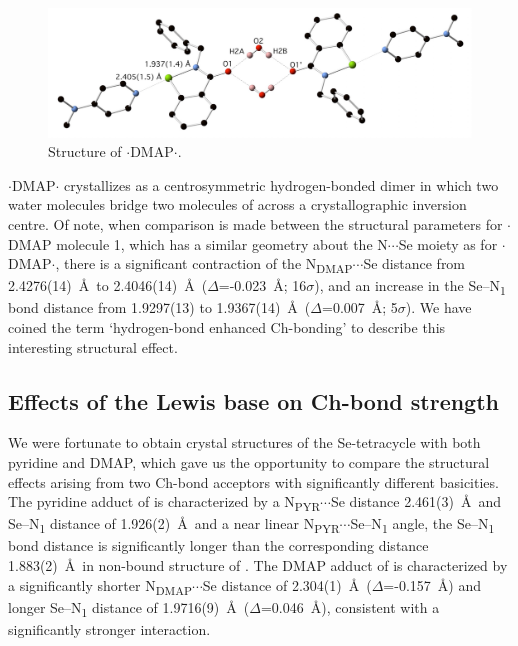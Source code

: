 \begin{figure}
  \centering
  \includegraphics[width=0.8\linewidth]{fig/benzyl-dmap-hydrate.pdf}
  \caption{Structure of $\cdot$DMAP$\cdot$.}
  \label{fig:benzyl-dmap-hydrate}
\end{figure}

$\cdot$DMAP$\cdot$ crystallizes as a centrosymmetric hydrogen-bonded dimer in which two water molecules bridge two molecules of  across a crystallographic inversion centre.
Of note, when comparison is made between the structural parameters for $\cdot$DMAP molecule 1, which has a similar geometry about the N$\cdots$Se moiety as for $\cdot$DMAP$\cdot$, there is a significant contraction of the N\textsubscript{DMAP}$\cdots$Se distance from 2.4276(14)~\AA\ to 2.4046(14)~\AA\ ($\Delta$=-0.023~\AA ; 16$\sigma$), and an increase in the Se--N\textsubscript{1} bond distance from 1.9297(13) to 1.9367(14)~\AA\ ($\Delta$=0.007~\AA ; 5$\sigma$).
We have coined the term `hydrogen-bond enhanced Ch-bonding' to describe this interesting structural effect.

\subsection{Effects of the Lewis base on Ch-bond strength}
We were fortunate to obtain crystal structures of the Se-tetracycle  with both pyridine and DMAP, which gave us the opportunity to compare the structural effects arising from two Ch-bond acceptors with significantly different basicities.
The pyridine adduct of  is characterized by a N\textsubscript{PYR}$\cdots$Se distance 2.461(3)~\AA\ and Se--N\textsubscript{1} distance of 1.926(2)~\AA\ and a near linear N\textsubscript{PYR}$\cdots$Se--N\textsubscript{1} angle, the Se--N\textsubscript{1} bond distance is significantly longer than the corresponding distance 1.883(2)~\AA\ in non-bound structure of .
The DMAP adduct of  is characterized by a significantly shorter N\textsubscript{DMAP}$\cdots$Se distance of 2.304(1)~\AA\ ($\Delta$=-0.157~\AA) and longer Se--N\textsubscript{1} distance of 1.9716(9)~\AA\ ($\Delta$=0.046~\AA), consistent with a significantly stronger interaction.

